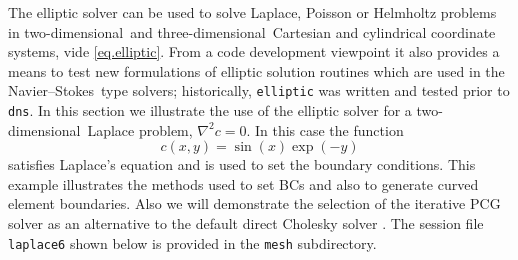 \documentclass[11pt]{report}
\newcommand\twod{two-di\-men\-sion\-al}
\newcommand\threed{three-di\-men\-sion\-al}
\newcommand\NavSto{Navier--Stokes}
\begin{document}
The elliptic solver can be used to solve Laplace, Poisson or Helmholtz
problems in \twod\ and \threed\ Cartesian and cylindrical coordinate
systems, vide \eqref{eq.elliptic}.  From a code development viewpoint
it also provides a means to test new formulations of elliptic solution
routines which are used in the \NavSto\ type solvers; historically,
\verb|elliptic| was written and tested prior to \verb|dns|.
%
In this section we illustrate the use of the elliptic solver for a \twod\
Laplace problem, $\nabla^2 c = 0$.  In this case the function
\begin{equation}
  c(x,y) = \sin(x) \exp(-y)
\end{equation}
satisfies Laplace's equation and is used to set the boundary
conditions.  This example illustrates the methods used to set BCs and
also to generate curved element boundaries.  Also we will demonstrate
the selection of the iterative PCG solver \citep{barrett94} as an
alternative to the default direct Cholesky solver
\citep{anderson99}. The session file \texttt{laplace6} shown below is
provided in the \verb|mesh| subdirectory.
%
\end{document}

